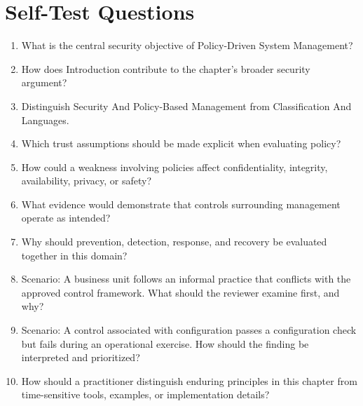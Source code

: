 \documentclass[11pt]{article}
\begin{document}
\section*{Self-Test Questions}
\begin{enumerate}
\item What is the central security objective of Policy-Driven System Management?
\item How does Introduction contribute to the chapter's broader security argument?
\item Distinguish Security And Policy-Based Management from Classification And Languages.
\item Which trust assumptions should be made explicit when evaluating policy?
\item How could a weakness involving policies affect confidentiality, integrity, availability, privacy, or safety?
\item What evidence would demonstrate that controls surrounding management operate as intended?
\item Why should prevention, detection, response, and recovery be evaluated together in this domain?
\item Scenario: A business unit follows an informal practice that conflicts with the approved control framework. What should the reviewer examine first, and why?
\item Scenario: A control associated with configuration passes a configuration check but fails during an operational exercise. How should the finding be interpreted and prioritized?
\item How should a practitioner distinguish enduring principles in this chapter from time-sensitive tools, examples, or implementation details?
\end{enumerate}
\end{document}
